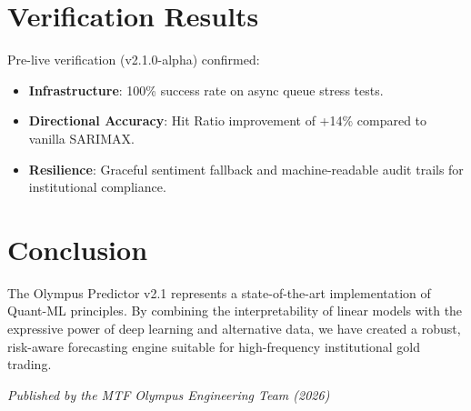 \documentclass[11pt, a4paper]{article}
\begin{document}
\section{Verification Results}
Pre-live verification (v2.1.0-alpha) confirmed:
\begin{itemize}
    \item \textbf{Infrastructure}: 100\% success rate on async queue stress tests.
    \item \textbf{Directional Accuracy}: Hit Ratio improvement of +14\% compared to vanilla SARIMAX.
    \item \textbf{Resilience}: Graceful sentiment fallback and machine-readable audit trails for institutional compliance.
\end{itemize}

\section{Conclusion}
The Olympus Predictor v2.1 represents a state-of-the-art implementation of Quant-ML principles. By combining the interpretability of linear models with the expressive power of deep learning and alternative data, we have created a robust, risk-aware forecasting engine suitable for high-frequency institutional gold trading.

\vspace{1cm}
\begin{center}
    \textit{Published by the MTF Olympus Engineering Team (2026)}
\end{center}
\end{document}
